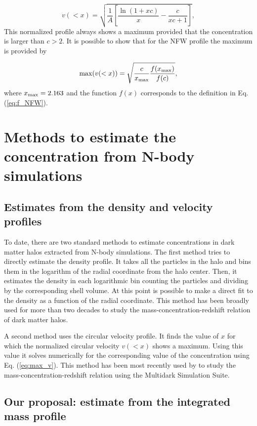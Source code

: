 \documentclass{emulateapj}
\begin{document}
\begin{equation}
v(<x)=\sqrt{\frac{1}{A}\left[\frac{\ln\left(1+xc\right)}{x}-\frac{c}{xc+1}\right]},
\end{equation}
%
This normalized profile always shows a maximum provided that the
concentration is larger than $c>2$.  It is possible to show that for
the NFW profile the maximum is provided by

\begin{equation}
\mathrm{max}(v(<x)) = \sqrt{\frac{c}{x_{\rm max}}\frac{f(x_{\rm
      max})}{f(c)}},
\label{eq:max_v}
\end{equation}
where $x_{\rm max}=2.163$ \citep{Klypin2016} and the function $f(x)$
corresponds to the definition in Eq. (\ref{eq:f_NFW}).

\section{Methods to estimate the concentration from N-body simulations}
\label{sec:method}

\subsection{Estimates from the density and velocity profiles}

To date, there are two standard methods to estimate concentrations in
dark matter halos extracted from N-body simulations.  The first method
tries to directly estimate the density profile.  It takes all the
particles in the halo and bins them in the logarithm of the radial
coordinate from the halo center.  Then, it estimates the density in
each logarithmic bin counting the particles and dividing by the
corresponding shell volume.  At this point is possible to make a
direct fit to the density as a function of the radial coordinate.
This method has been broadly used for more than two decades to study
the mass-concentration-redshift relation of dark matter halos.
 
A second method uses the circular velocity profile.  It finds the
value of $x$ for which the normalized circular velocity $v(<x)$ shows
a maximum.  Using this value it solves numerically for the
corresponding value of the concentration using Eq. (\ref{eq:max_v}).
This method has been most recently used by \cite{Klypin2016} to study
the mass-concentration-redshift relation using the Multidark
Simulation Suite.


\subsection{Our proposal: estimate from the integrated mass profile}
\end{document}
